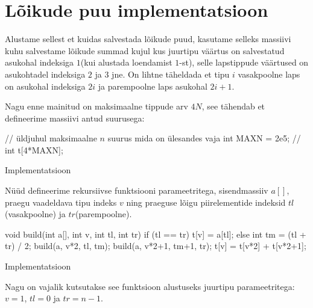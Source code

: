 \documentclass{trkut}
\begin{document}
\section{Lõikude puu implementatsioon}

Alustame sellest et kuidas salvestada lõikude puud, kasutame selleks massiivi kuhu salvestame lõikude summad kujul kus juurtipu väärtus on salvestatud asukohal indeksiga $1$(kui alustada loendamist $1$-st), selle lapstippude väärtused on asukohtadel indeksiga $2$ ja $3$ jne. On lihtne täheldada et tipu $i$ vasakpoolne laps on asukohal indeksiga $2i$ ja parempoolne laps asukohal $2i+1$. \parencite{EMaxx}

Nagu enne mainitud on maksimaalne tippude arv $4N$, see tähendab et defineerime massiivi antud suurusega:
\begin{cclol}
// üldjuhul maksimaalne $n$ suurus mida on ülesandes vaja
int MAXN = 2e5;
//
int t[4*MAXN];
\end{cclol}
\begin{kk}[H]%
    \caption{Implementatsioon}%
    \label{EMaxx}%
    \end{kk}
Nüüd defineerime rekursiivse funktsiooni parameetritega, sisendmassiiv $a[]$, praegu vaadeldava tipu indeks $v$ ning praeguse lõigu piirelementide indeksid $tl$(vasakpoolne) ja $tr$(parempoolne).
\begin{cclol}
void build(int a[], int v, int tl, int tr) {
    if (tl == tr) {
        t[v] = a[tl];
    } else {
        int tm = (tl + tr) / 2;
        build(a, v*2, tl, tm);
        build(a, v*2+1, tm+1, tr);
        t[v] = t[v*2] + t[v*2+1];
    }
}
\end{cclol}
 \begin{kk}[H]%
    \caption{Implementatsioon}%
    \label{EMaxx}%
    \end{kk}
Nagu on vajalik kutsutakse see funktsioon alustuseks juurtipu parameetritega: $v=1$, $tl=0$ ja $tr=n-1$.
\end{document}
